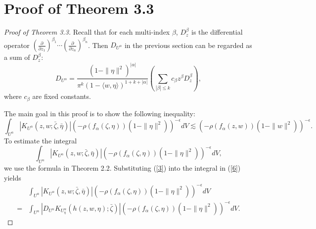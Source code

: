 \documentclass[reqno,12pt]{amsart}
\numberwithin{equation}{section}
\begin{document}
		\section{Proof of Theorem 3.3}
\begin{proof}[Proof of Theorem 3.3]
	Recall that for each multi-index $\beta$,   $D^{\beta}_z$ is the differential operator $(\frac{\partial}{\partial z_1})^{\beta_1}\cdots (\frac{\partial}{\partial z_n})^{\beta_n}$.   Then $D_{U^{\alpha}}$ in the previous section can be regarded as a sum of $D^{\beta}_z$:
{\begin{equation}
	D_{U^{\alpha}}=\frac{(1-\|\eta\|^2)^{|\alpha|}}{\pi^k(1- \langle w,\eta\rangle)^{1+k+|\alpha|}}\left(\sum_{|\beta|\leq k} c_{\beta}z^{\beta}D^\beta_z\right),
	\end{equation}
	where $c_\beta$ are fixed constants.}
	  
	{The main goal in this proof is to show the following inequality: 
		\begin{equation}\label{59}
		\int_{U^{\alpha}}\left|K_{U^{\alpha}}(z ,w;\bar\zeta ,\bar \eta)\right|\left(-\rho\left(f_\alpha(\zeta,\eta) \right)(1-\|\eta\|^2)\right)^{-\epsilon}dV\lesssim \left(-\rho\left(f_\alpha(z,w) \right)(1-\|w\|^2)\right)^{-\epsilon}.
		\end{equation}}
	To estimate the integral
			\begin{equation}\label{6}
			\int_{U^{\alpha}}\left|K_{U^{\alpha}}(z ,w;\bar\zeta ,\bar \eta)\right|\left(-\rho\left(f_\alpha(\zeta,\eta) \right)(1-\|\eta\|^2)\right)^{-\epsilon}dV,
			\end{equation}
			we use the formula in Theorem 2.2.
			Substituting (\ref{3}) into the integral in (\ref{6}) yields
			\begin{align}\label{7}
			&\int_{U^{\alpha}}\left|K_{U^{\alpha}}(z ,w;\bar\zeta ,\bar \eta)\right|\left(-\rho\left(f_\alpha(\zeta,\eta) \right)(1-\|\eta\|^2)\right)^{-\epsilon}dV\nonumber\\=&\int_{U^{\alpha}}\left|D_{U^{\alpha}}K_{U^{\alpha}_{\eta}}\left(h(z,w,\eta) ;\bar\zeta \right)\right|\left(-\rho\left(f_\alpha(\zeta,\eta) \right)(1-\|\eta\|^2)\right)^{-\epsilon}dV.
			\end{align}
		

\end{proof}
\end{document}
